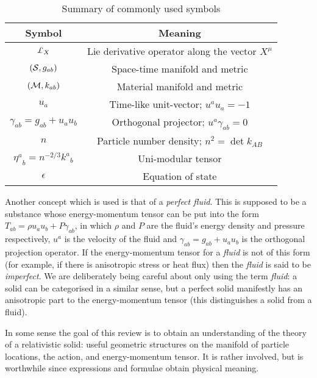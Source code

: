 {\renewcommand{\arraystretch}{1.4}
\begin{table}%
\begin{center}
\begin{tabular}{||c |  c ||}
\hline
\textbf{Symbol} & \textbf{Meaning} \\
\hline
$\lied{X}$ & Lie derivative operator along the vector $X^{\mu}$\\\hline
$\left(\mathcal{S}, g_{ab}\right)$ & Space-time manifold and metric\\\hline
$\left(\mathcal{M}, k_{ab}\right)$ & Material manifold and metric \\\hline
$u_a$ & Time-like unit-vector; $u^au_a = -1$\\\hline
$\gamma_{ab} = g_{ab} + u_au_b$ & Orthogonal projector; $u^a\gamma_{ab}=0$\\\hline
$n$ & Particle number density; $n^2 = \det k_{AB} $\\\hline
${\eta^a}_b = n^{-2/3}{k^a}_b$ & Uni-modular tensor\\\hline
$\epsilon$ & Equation of state
\\\hline
\end{tabular}\caption{Summary of commonly used symbols}\label{tab:common}
\end{center}
\end{table}
}

Another  concept which is used is that of a \textit{perfect fluid}. This is supposed to be a substance whose energy-momentum tensor can be put into the form $T_{ab} = \rho u_au_b + P\gamma_{ab}$,
in which $\rho$ and $P$ are the  fluid's energy density and pressure respectively, $u^a$ is the velocity of the fluid and $\gamma_{ab} = g_{ab} + u_au_b$ is the orthogonal projection operator. If the energy-momentum tensor for a \textit{fluid} is not of this form (for example, if there is anisotropic stress or heat flux) then the \textit{fluid} is said to be   \textit{imperfect}. We are deliberately being careful about only using the term \textit{fluid}: a solid can be categorised in a similar sense, but a perfect solid manifestly has an anisotropic part to the energy-momentum tensor (this  distinguishes a solid from a fluid).


In some sense the  goal of this review is to obtain an understanding of the theory of a relativistic solid: useful geometric structures on the manifold of particle locations, the action, and energy-momentum tensor. It is rather involved, but is worthwhile since expressions and formulae obtain physical meaning.

